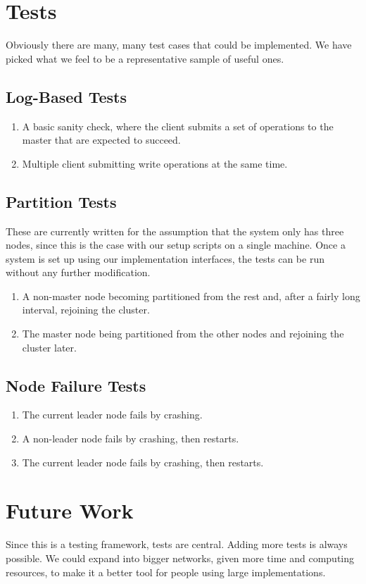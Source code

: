 \documentclass[UTF8]{article}
\begin{document}
\section{Tests}
Obviously there are many, many test cases that could be implemented. We have picked what we feel to be a representative sample of useful ones.
\subsection{Log-Based Tests}
\begin{enumerate}
  \item A basic sanity check, where the client submits a set of operations to the master that are expected to succeed.
  \item Multiple client submitting write operations at the same time.
\end{enumerate}
\subsection{Partition Tests}
These are currently written for the assumption that the system only has three nodes, since this is the case with our setup scripts on a single machine. Once a system is set up using our implementation interfaces, the tests can be run without any further modification. 
\begin{enumerate}
  \item A non-master node becoming partitioned from the rest and, after a fairly long interval, rejoining the cluster.
  \item The master node being partitioned from the other nodes and rejoining the cluster later.
\end{enumerate}
\subsection{Node Failure Tests}
\begin{enumerate}
  \item The current leader node fails by crashing.
  \item A non-leader node fails by crashing, then restarts.
  \item The current leader node fails by crashing, then restarts. 
\end{enumerate}

\section{Future Work}
Since this is a testing framework, tests are central. Adding more tests is always possible. We could expand into bigger networks, given more time and computing resources, to make it a better tool for people using large implementations.
\end{document}
